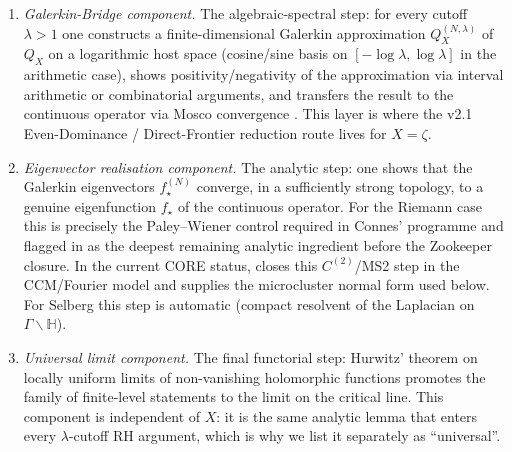 \documentclass[11pt]{article}
\theoremstyle{definition}
\theoremstyle{remark}
\begin{document}
\begin{enumerate}
\item[\textbf{(GBC)}] \emph{Galerkin-Bridge component.} The
algebraic-spectral step: for every cutoff $\lambda > 1$ one
constructs a finite-dimensional Galerkin approximation $Q_X^{(N,\lambda)}$
of $Q_X$ on a logarithmic host space (cosine/sine basis on
$[-\log\lambda,\log\lambda]$ in the arithmetic case), shows
positivity/negativity of the approximation via interval arithmetic
or combinatorial arguments, and transfers the result to the
continuous operator via Mosco convergence
\cite{MetaGalerkinBridge,ConnesConsaniMoscovici2025}. This layer is where the
v2.1 Even-Dominance / Direct-Frontier reduction route
\cite{Geiger2026RHII} lives for $X = \zeta$.

\item[$\boldsymbol{C^{(2)}}$] \emph{Eigenvector realisation
component.} The analytic step: one shows that the Galerkin
eigenvectors $f_\star^{(N)}$ converge, in a sufficiently strong
topology, to a genuine eigenfunction $f_\star$ of the continuous
operator. For the Riemann case this is precisely the Paley--Wiener
control required in Connes' programme
\cite{Connes2026,ConnesConsaniMoscovici2025} and flagged in \cite{Geiger2026RHII}
as the deepest remaining analytic ingredient before the Zookeeper
closure.  In the current CORE status, \cite{Zookeeper2026} closes this
$C^{(2)}$/MS2 step in the CCM/Fourier model and supplies the
microcluster normal form used below.  For Selberg this step is
automatic (compact resolvent of the Laplacian on
$\Gamma\backslash\mathbb{H}$).

\item[\textbf{(Hurwitz)}] \emph{Universal limit component.} The
final functorial step: Hurwitz' theorem on locally uniform limits
of non-vanishing holomorphic functions promotes the family of
finite-level statements to the limit on the critical line. This
component is independent of $X$: it is the same analytic lemma
that enters every $\lambda$-cutoff RH argument, which is why we
list it separately as ``universal''.
\end{enumerate}
\end{document}
